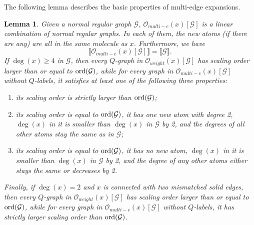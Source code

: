 \documentclass{article}
\newcommand{\1}{\mathds{1}}
\numberwithin{equation}{section}
\newcommand{\ord}{{\rm{ord}}}
\renewcommand{\cal}{\mathcal}
\renewcommand{\geq}{\geqslant}
\renewcommand{\ge}{\geq}
\theoremstyle{plain} %
\newtheorem{lemma}[theorem]{Lemma}
\theoremstyle{remark}
\newtheorem{remark}[theorem]{Remark}
\begin{document}
  


\iffalse
The following lemma describes the basic properties of multi-edge expansions.
   
\begin{lemma}\label{expandmulti}
Given a normal regular graph $\cal G$, ${\cal O}_{multi-e}(x)[\cal G]$ is a linear combination of normal regular graphs. In each of them, the new atoms (if there are any) are all in the same molecule as $x$. Furthermore, we have 
$$ \llbracket {\cal O}_{multi-e}(x)[\cal G]\rrbracket  =\llbracket \cal G\rrbracket.$$ 
 If $\deg(x)\ge 4$ in $\cal G$, 
then every $Q$-graph in ${\cal O}_{weight}(x)[\cal G]$ has scaling order larger than or equal to $\ord(\cal G)$, while for every graph in ${\cal O}_{multi-e}(x)[\cal G]$ without $Q$-labels, it satisfies at least one of the following three properties: 
\begin{enumerate}
\item its scaling order is strictly larger than $\ord(\cal G)$; 
\item its scaling order is equal to $\ord(\cal G)$, it has one new atom with degree 2, $\deg(x)$ in it is smaller than $\deg(x)$ in $\cal G$ by 2, and the degrees of all other atoms stay the same as in $\cal G$;
\item its scaling order is equal to $\ord(\cal G)$, it has no new atom, $\deg(x)$ in it is smaller than $\deg(x)$ in $\cal G$ by 2, and the degree of any other atoms either stays the same or decreases by 2. 
\end{enumerate}
Finally, if $\deg(x)=2$ and $x$ is connected with two mismatched solid edges, then every $Q$-graph in ${\cal O}_{weight}(x)[\cal G]$ has scaling order larger than or equal to $\ord(\cal G)$, while for every graph in ${\cal O}_{multi-e}(x)[\cal G]$ without $Q$-labels, it has strictly larger scaling order than $\ord(\cal G)$.
  \end{lemma}
\end{document}
